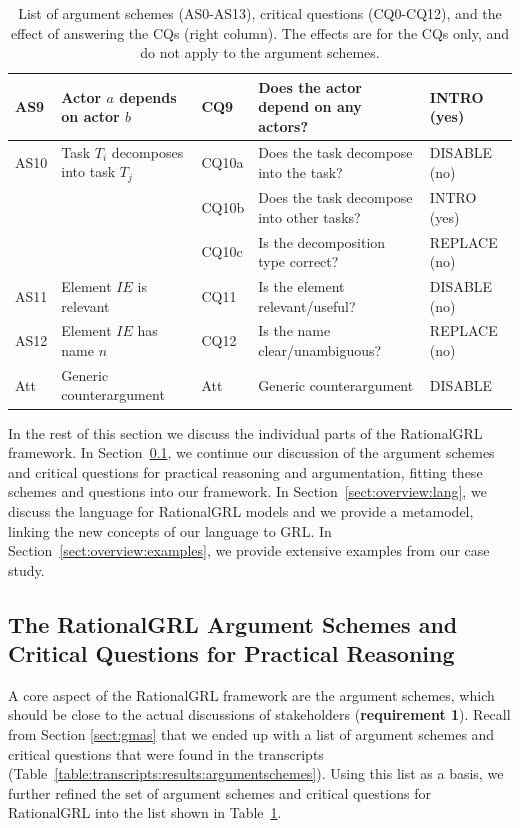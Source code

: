 \begin{table}[t]
\begin{tabularx}{\textwidth}{|l|l|l|X|l|}
\hline
AS9 & Actor $a$ depends on actor $b$ & CQ9 & Does the actor depend on any actors?& \textsf{INTRO} (yes)\\
\hline
AS10 & Task $T_i$ decomposes into task $T_j$ & CQ10a & Does the task decompose into the task? & \textsf{DISABLE} (no)\\
 &  & CQ10b & Does the task decompose into other tasks?& \textsf{INTRO} (yes)\\
 &  & CQ10c & Is the decomposition type correct? & \textsf{REPLACE} (no)\\
\hline
AS11 & Element $IE$ is relevant & CQ11 & Is the element relevant/useful? & \textsf{DISABLE} (no)\\
\hline
AS12 & Element $IE$ has name $n$ & CQ12 & Is the name clear/unambiguous? & \textsf{REPLACE} (no)\\
\hline
\hline
Att & Generic counterargument & Att & Generic counterargument & \textsf{DISABLE}\\
\hline
\end{tabularx}
\caption{List of argument schemes (AS0-AS13), critical questions (CQ0-CQ12), and the effect of answering the CQs (right column). The effects are for the CQs only, and do not apply to the argument schemes.}
\label{table:argument-schemes}
\end{table}

In the rest of this section we discuss the individual parts of the RationalGRL framework. In Section~\ref{sect:overview:as}, we continue our discussion of the argument schemes and critical questions for practical reasoning and argumentation, fitting these schemes and questions into our framework. In Section~\ref{sect:overview:lang}, we discuss the language for RationalGRL models and we provide a metamodel, linking the new concepts of our language to GRL. In Section~\ref{sect:overview:examples}, we provide extensive examples from our case study.  

\subsection{The RationalGRL Argument Schemes and Critical Questions for Practical Reasoning}
\label{sect:overview:as}

A core aspect of the RationalGRL framework are the argument schemes, which should be close to the actual discussions of stakeholders (\textbf{requirement 1}). Recall from Section \ref{sect:gmas} that we ended up with a list of argument schemes and critical questions that were found in the transcripts (Table~\ref{table:transcripts:results:argumentschemes}). Using this list as a basis, we further refined the set of argument schemes and critical questions for RationalGRL into the list shown in Table~\ref{table:argument-schemes}. 

